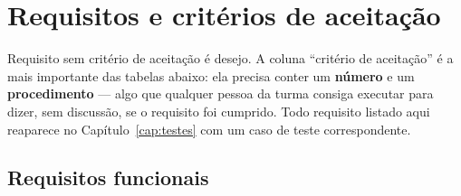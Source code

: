 \chapter{Requisitos e critérios de aceitação}
\label{cap:requisitos}
\rubricaRobustez

\begin{orientacao}
Requisito sem critério de aceitação é desejo. A coluna
\enquote{critério de aceitação} é a mais importante das tabelas abaixo:
ela precisa conter um \textbf{número} e um \textbf{procedimento} --- algo
que qualquer pessoa da turma consiga executar para dizer, sem discussão,
se o requisito foi cumprido. Todo requisito listado aqui reaparece no
Capítulo~\ref{cap:testes} com um caso de teste correspondente.
\end{orientacao}

\section{Requisitos funcionais}

